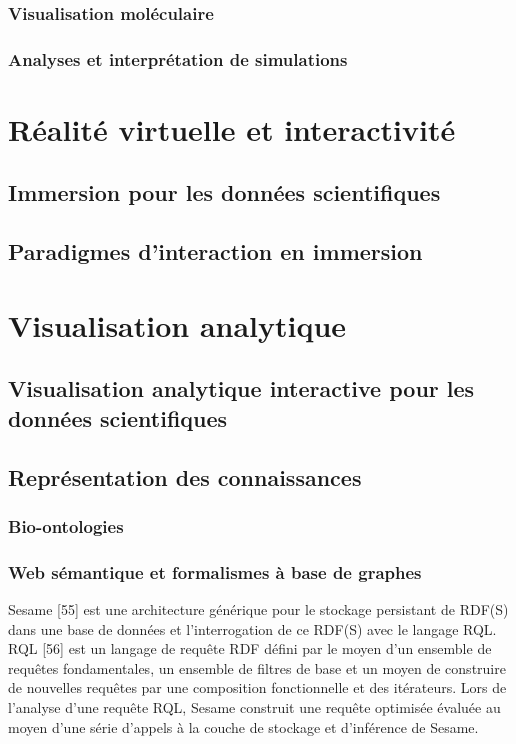 \subsubsection{Visualisation moléculaire}

\subsubsection{Analyses et interprétation de simulations}

\section{Réalité virtuelle et interactivité}

\subsection{Immersion pour les données scientifiques}

\subsection{Paradigmes d'interaction en immersion}

\section{Visualisation analytique}

\subsection{Visualisation analytique interactive pour les données scientifiques}

\subsection{Représentation des connaissances}

\subsubsection{Bio-ontologies}

\cite{schulze-kremer_ontologies_2002}

\subsubsection{Web sémantique et formalismes à base de graphes}

Sesame [55] est une architecture générique pour le stockage persistant de RDF(S) dans une base de données et l'interrogation de ce RDF(S) avec le langage RQL. RQL [56] est un langage de requête RDF défini par le moyen d'un ensemble de requêtes fondamentales, un ensemble de filtres de base et un moyen de construire de nouvelles requêtes par une composition fonctionnelle et des itérateurs. Lors de l'analyse d’une requête RQL, Sesame construit une requête optimisée évaluée au moyen d'une série d'appels à la couche de stockage et d’inférence de Sesame.

